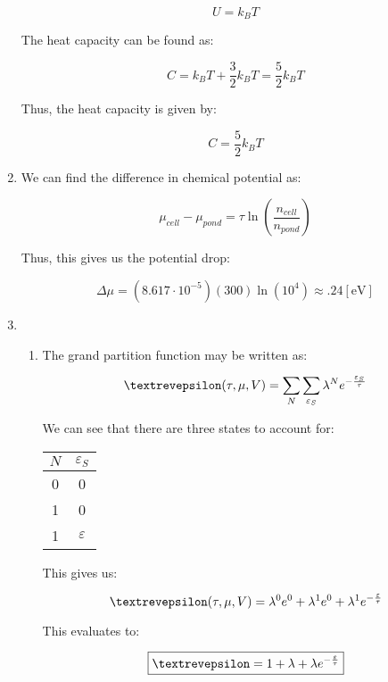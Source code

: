 \begin{enumerate}
    $$U=k_BT$$

    The heat capacity can be found as:

    $$C=k_BT+\frac{3}{2}k_BT=\frac{5}{2}k_BT$$

    Thus, the heat capacity is given by:

    $$\boxed{C=\frac{5}{2}k_BT}$$

  \item

    We can find the difference in chemical potential as:

    $$\mu_{cell}-\mu_{pond}=\tau\ln\left( \frac{n_{cell}}{n_{pond}} \right)$$

    Thus, this gives us the potential drop:

    $$\boxed{\Delta \mu=(8.617\cdot10^{-5})(300)\ln(10^4)\approx.24[\si{\eV}]}$$

    \setcounter{enumi}{5}

  \item

    \begin{enumerate}

      \item 

        The grand partition function may be written as:

        $$\text{\textrevepsilon}(\tau,\mu,V)=\sum_N\sum_{\varepsilon_S}\lambda^Ne^{-\frac{\varepsilon_S}{\tau}}$$

        We can see that there are three states to account for:

        \begin{center}
          \begin{tabular}[H]{|c|c|}
            \hline
            $N$ & $\varepsilon_S$\\
            \hline
            0 & 0\\
            \hline
            1 & 0\\
            \hline
            1 & $\varepsilon$\\
            \hline
          \end{tabular}
        \end{center}

        This gives us:

        $$\text{\textrevepsilon}(\tau,\mu,V)=\lambda^0e^0+\lambda^1e^0+\lambda^1e^{-\frac{\varepsilon}{\tau}}$$

        This evaluates to:

        $$\boxed{\text{\textrevepsilon}=1+\lambda+\lambda e^{-\frac{\varepsilon}{\tau}}}$$


\end{enumerate}
\end{enumerate}
